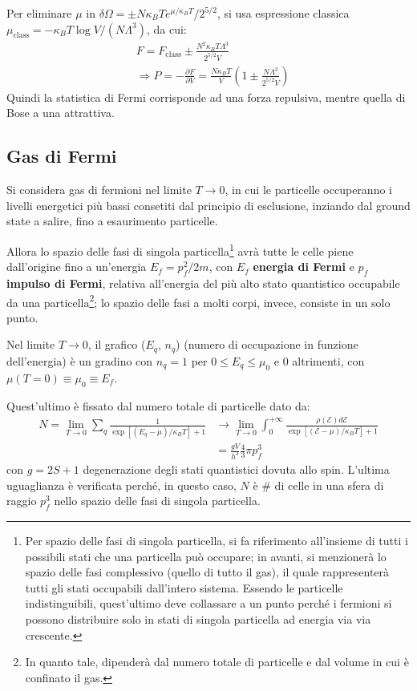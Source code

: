 \documentclass[10pt, a4paper]{scrartcl}
\numberwithin{equation}{subsection}
\theoremstyle{style1}
\theoremstyle{style2}
\begin{document}
Per eliminare $\mu $ in $\delta \Omega  = \pm N\kappa _B Te^{\mu  / \kappa _B T} / 2^{5 / 2} $, si usa espressione classica $\mu _\text{class}= - \kappa _B T \log V /(N\Lambda ^3)$, da cui:
\begin{equation}
	\begin{split}
		&F = F_\text{class} \pm \frac{N^2 \kappa _B T \Lambda ^3}{2^{5 / 2}V }\\
		& \Rightarrow P = - \frac{\partial F }{\partial V } = \frac{N\kappa _B T}{V}\left(1 \pm \frac{N\Lambda ^3}{2^{5 / 2} V}\right) 
	\end{split}
\end{equation}
Quindi la statistica di Fermi corrisponde ad una forza repulsiva, mentre quella di Bose a una attrattiva.
\subsection{Gas di Fermi}

Si considera gas di fermioni nel limite $T \to 0 $, in cui le particelle occuperanno i livelli energetici pi\`u bassi consetiti dal principio di esclusione, inziando dal ground state a salire, fino a esaurimento particelle. 

Allora lo spazio delle fasi di singola particella\footnote{Per spazio delle fasi di singola particella, si fa riferimento all'insieme di tutti i possibili stati che una particella pu\`o occupare; in avanti, si menzioner\`a lo spazio delle fasi complessivo (quello di tutto il gas), il quale rappresenter\`a tutti gli stati occupabili dall'intero sistema. Essendo le particelle indistinguibili, quest'ultimo deve collassare a un punto perch\'e i fermioni si possono distribuire solo in stati di singola particella ad energia via via crescente.} avr\`a tutte le celle piene dall'origine fino a un'energia $E_f = p_f^2 / 2m$, con $E_f$ \textbf{energia di Fermi} e $p_f$ \textbf{impulso di Fermi}, relativa all'energia del pi\`u alto stato quantistico occupabile da una particella\footnote{In quanto tale, dipender\`a dal numero totale di particelle e dal volume in cui è confinato il gas.}; lo spazio delle fasi a molti corpi, invece, consiste in un solo punto.

Nel limite $T\to 0$, il grafico ($E_q$, $n_q$) (numero di occupazione in funzione dell'energia) \`e un gradino con $n_q = 1$ per $0\le E_q\le \mu_0$ e $0$ altrimenti, con $\mu (T=0) \equiv \mu_{0}\equiv E_f$.

Quest'ultimo \`e fissato dal numero totale di particelle dato da:
\begin{equation}
	\begin{split}
		N = \lim_{T \to 0} \sum_{q}^{} \frac{1}{\exp\left[ (E_q - \mu  ) / \kappa _B T \right]  + 1 } &\to \lim_{T \to 0 } \int_{0} ^{+\infty} \frac{\rho (\mathscr{E})d \mathscr{E}}{\exp\left[ (\mathscr{E}-\mu ) / \kappa _B T \right] + 1}\\
		  & =  \frac{gV}{h^3}\frac{4}{3}\pi p^3_f
	\end{split}
\end{equation}
con $g = 2S + 1$ degenerazione degli stati quantistici dovuta allo spin. L'ultima uguaglianza \`e verificata perch\'e, in questo caso, $N$ \`e \# di celle in una sfera di raggio $p_f^3$ nello spazio delle fasi di singola particella. 
\end{document}
